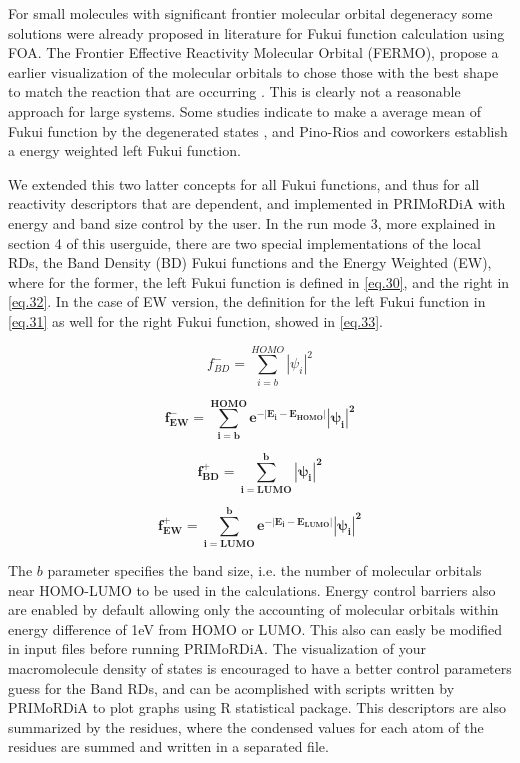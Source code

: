 \documentclass[a4paper,11pt]{refart}
\begin{document}
For small molecules with significant frontier molecular orbital degeneracy some solutions were already proposed in literature for Fukui function calculation using FOA. The Frontier Effective Reactivity Molecular Orbital (FERMO), propose a earlier visualization of the molecular orbitals to chose those with the best shape to match the reaction that are occurring \cite{la2012computational}. This is clearly not a reasonable approach for large systems. Some studies indicate to make a average mean of Fukui function by the degenerated states \cite{gal2011new,torrent2008hardness}, and Pino-Rios and coworkers \cite{pino2017proposal} establish a energy weighted left Fukui function. 

We extended this two latter concepts for all Fukui functions, and thus for all reactivity descriptors that are dependent, and implemented in PRIMoRDiA with energy and band size control by the user. In the run mode 3, more explained in section 4 of this userguide, there are two special implementations of the local RDs, the Band Density (BD) Fukui functions and the Energy Weighted (EW), where for the former, the left Fukui function is defined in \autoref{eq.30}, and the right in \autoref{eq.32}. In the case of EW version, the definition for the left Fukui function in \autoref{eq.31} as well for the right Fukui function, showed in \autoref{eq.33}. 
 
\begin{equation}
f^-_{BD} = \sum^{HOMO}_{i=b} |\psi_i|^2 
\label{eq.30}
\end{equation}

\begin{equation}
\mathbf{f^-_{EW} = \sum^{HOMO}_{i=b} e^{-|E_{i}-E_{HOMO}|}|\psi_i|^2}
\label{eq.31}
\end{equation}

\begin{equation}
\mathbf{f^+_{BD} = \sum^{b}_{i=LUMO} |\psi_i|^2 }
\label{eq.32}
\end{equation}

\begin{equation}
\mathbf{f^+_{EW} =  \sum^{b}_{i=LUMO} e^{-|E_{i}-E_{LUMO}|} |\psi_i|^2}
\label{eq.33}
\end{equation}

The $b$ parameter specifies the band size, i.e. the number of molecular orbitals near HOMO-LUMO to be used in the calculations. Energy control barriers also are enabled by default allowing only the accounting of molecular orbitals within energy difference of 1eV from HOMO or LUMO. This also can easly be modified in input files before running PRIMoRDiA. The visualization of your macromolecule density of states is encouraged to have a better control parameters guess for the Band RDs, and can be acomplished with scripts written by PRIMoRDiA to plot graphs using R statistical package. This descriptors are also summarized by the residues, where the condensed values for each atom of the residues are summed and written in a separated file.
\end{document}
